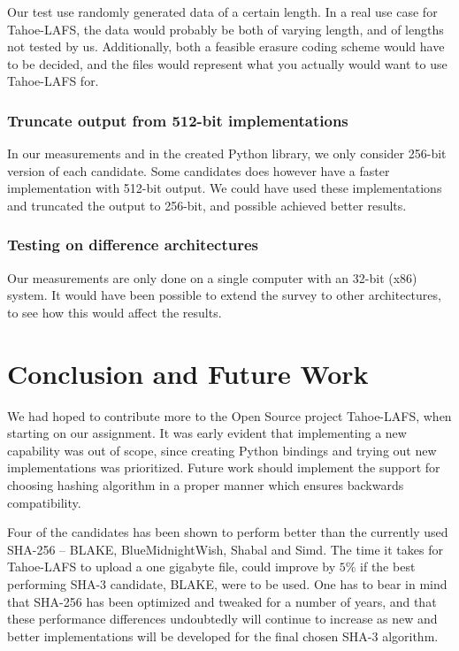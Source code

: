 \documentclass[english,12pt,a4paper]{book}
\begin{document}
Our test use randomly generated data of a certain length. In a real use case for
Tahoe-\ac{LAFS}, the data would probably be both of varying length, and of
lengths not tested by us. Additionally, both a feasible erasure coding
scheme would have to be decided, and the files would represent what you actually
would want to use Tahoe-\ac{LAFS} for.

\subsection{Truncate output from 512-bit implementations}

In our measurements and in the created Python library, we only consider 256-bit version of each
candidate. Some candidates does however have a faster implementation with
512-bit output. We could have used these implementations and truncated the
output to 256-bit, and possible achieved better results.

\subsection{Testing on difference architectures}

Our measurements are only done on a single computer with an 32-bit (x86)
system. It would have been possible to extend the survey to other
architectures, to see how this would affect the results.

\chapter{Conclusion and Future Work}


We had hoped to contribute more to the Open Source project Tahoe-LAFS, when
starting on our assignment. It was early evident that implementing a new
capability was out of scope, since creating Python bindings and trying out
new implementations was prioritized. Future work should implement the support
for choosing hashing algorithm in a proper manner which ensures backwards
compatibility.

Four of the candidates has been shown to perform better than the currently used
SHA-256 -- BLAKE, BlueMidnightWish, Shabal and Simd. The time it takes for
Tahoe-LAFS to upload a one gigabyte file, could improve by $5\%$ if the best
performing SHA-3 candidate, BLAKE, were to be used. One has to bear in mind that
SHA-256 has been optimized and tweaked for a number of years, and that these
performance differences undoubtedly will continue to increase as new and better
implementations will be developed for the final chosen \ac{SHA}-3 algorithm.
\end{document}
